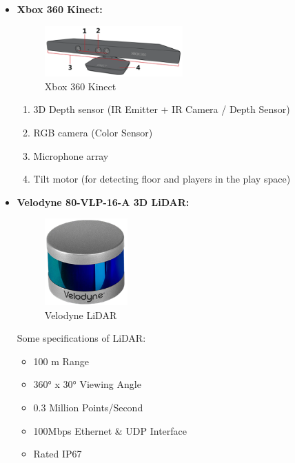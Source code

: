 \documentclass[12pt]{article}
\begin{document}
\begin{itemize}
    \item \textbf{Xbox 360 Kinect:} \\
          \begin{figure}[H]
              \centering
              \includegraphics[width=0.5\textwidth]{XBoxKinect.png}
              \caption{Xbox 360 Kinect~\cite{XboxKinect}}
          \end{figure}
          
          \begin{enumerate}
              \item 3D Depth sensor (IR Emitter + IR Camera / Depth Sensor)
              \item RGB camera (Color Sensor)
              \item Microphone array
              \item Tilt motor (for detecting floor and players in the play space)
          \end{enumerate}
          
    \item \textbf{Velodyne 80-VLP-16-A 3D LiDAR:} \\
          \begin{figure}[H]
              \centering
              \includegraphics[width=0.3\textwidth]{LiDAR.png}
              \caption{Velodyne LiDAR}
          \end{figure}
          
          Some specifications of LiDAR:
          
          \begin{itemize}
              \item 100 m Range
              \item 360° x 30° Viewing Angle
              \item 0.3 Million Points/Second
              \item 100Mbps Ethernet \& UDP Interface
              \item Rated IP67
          \end{itemize}
\end{itemize}
\end{document}
